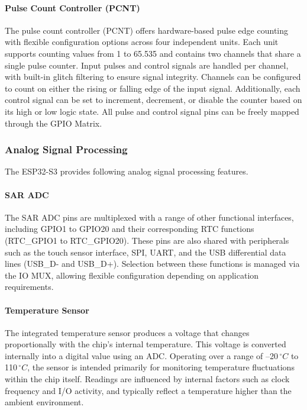 \paragraph{Pulse Count Controller (PCNT)}
The pulse count controller (PCNT) offers hardware-based pulse edge counting with flexible configuration options across four independent units. Each unit supports counting values from 1 to 65.535 and contains two channels that share a single pulse counter. Input pulses and control signals are handled per channel, with built-in glitch filtering to ensure signal integrity. Channels can be configured to count on either the rising or falling edge of the input signal. Additionally, each control signal can be set to increment, decrement, or disable the counter based on its high or low logic state. All pulse and control signal pins can be freely mapped through the GPIO Matrix.

\subsubsection{Analog Signal Processing}
The ESP32-S3 provides following analog signal processing features.

\paragraph{SAR ADC}
The SAR ADC pins are multiplexed with a range of other functional interfaces, including GPIO1 to GPIO20 and their corresponding RTC functions (RTC\_GPIO1 to RTC\_GPIO20). These pins are also shared with peripherals such as the touch sensor interface, SPI, UART, and the USB differential data lines (USB\_D- and USB\_D+). Selection between these functions is managed via the IO MUX, allowing flexible configuration depending on application requirements.

\paragraph{Temperature Sensor}
The integrated temperature sensor produces a voltage that changes proportionally with the chip’s internal temperature. This voltage is converted internally into a digital value using an ADC. Operating over a range of –20\,$^\circ C$ to 110\,$^\circ C$, the sensor is intended primarily for monitoring temperature fluctuations within the chip itself. Readings are influenced by internal factors such as clock frequency and I/O activity, and typically reflect a temperature higher than the ambient environment.

